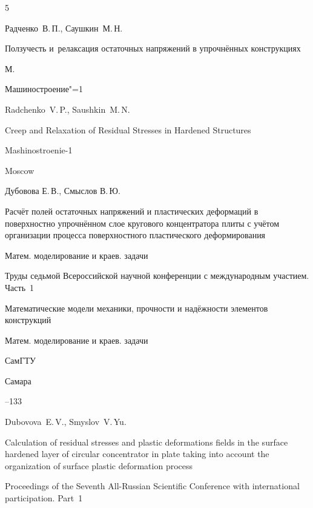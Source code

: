 \begin{thebibliography}{5}




\by Радченко~В.\,П., Саушкин~М.\,Н.

\book Ползучесть и~релаксация остаточных напряжений в упрочнённых конструкциях

\publaddr М.

\publ Машиностроение"=1



\misctransl 

\by Radchenko~V.\,P., Saushkin~M.\,N.

\book Creep and Relaxation of Residual Stresses in Hardened Structures 

\publ Mashinostroenie-1

\publaddr Moscow 






\by Дубовова Е.\,В., Смыслов В.\,Ю.

\paper Расчёт полей остаточных напряжений и пластических деформаций в поверхностно упрочнённом слое кругового концентратора плиты с учётом организации процесса поверхностного пластического деформирования

\serial Матем. моделирование и краев. задачи

\inbook Труды седьмой Всероссийской научной конференции с международным участием. \rm Часть~1

\bookinfo Математические модели механики, прочности и надёжности элементов конструкций

\serial Матем. моделирование и краев. задачи

\publ СамГТУ

\publaddr Самара


--133

\misctransl 

\by Dubovova~E.\,V., Smyslov~V.\,Yu.

\paper Calculation of  residual stresses and plastic deformations fields in the surface hardened layer of circular  concentrator in plate taking into account the organization of  surface plastic deformation process

\inbook Proceedings of the Seventh All-Russian Scientific Conference with international participation. \rm Part~1


\end{thebibliography}
